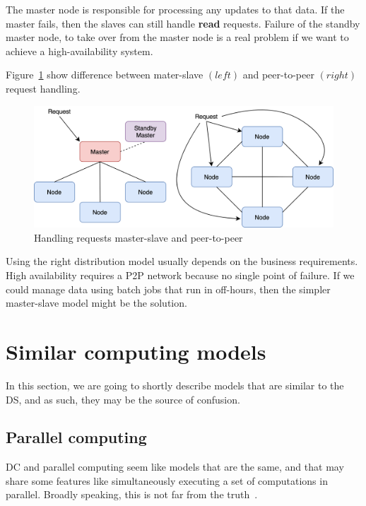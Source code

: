 The master node is responsible for processing any updates to that data. If the master fails, then the slaves can still handle \textbf{read} requests. Failure of the standby master node, to take over from the master node is a real problem if we want to achieve a high-availability system.

Figure~\ref{fig:fig16} show difference between mater-slave $(left)$ and peer-to-peer $(right)$ request handling.

\begin{figure}[H]
	\begin{center}
		\includegraphics[scale=0.7]{images/Figure16.png}
	\end{center}
	\vspace{-0.6cm}
	\caption{Handling requests master-slave and peer-to-peer}
	\label{fig:fig16}
\end{figure}

Using the right distribution model usually depends on the business requirements. High availability requires a P2P network because no single point of failure. If we could manage data using batch jobs that run in off-hours, then the simpler master-slave model might be the solution.
%
%
\section{Similar computing models}\label{sec:similar_models}
%
In this section, we are going to shortly describe models that are similar to the DS, and as such, they may be the source of confusion.
%
%
\subsection{Parallel computing}\label{sec:parallel_computing}
%
DC and parallel computing seem like models that are the same, and that may share some features like simultaneously executing a set of computations in parallel. Broadly speaking, this is not far from the truth~\cite{Vera16}. 


